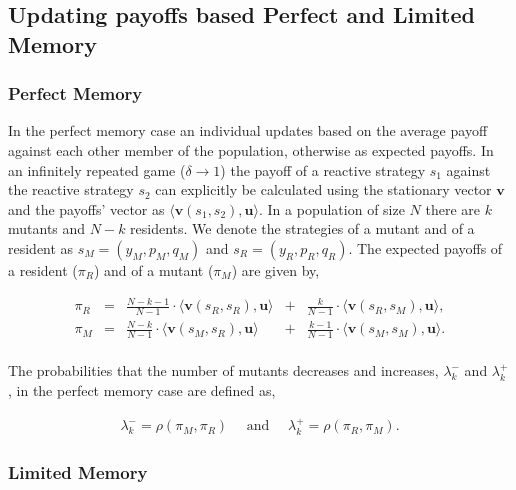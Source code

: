 \documentclass[11pt]{article}
\theoremstyle{plainCl1}
\theoremstyle{plainCl2}
\begin{document}
\subsection{Updating payoffs based Perfect and Limited Memory}

\subsubsection*{Perfect Memory}

In the perfect memory case an individual updates based on the average payoff
against each other member of the population, otherwise as expected payoffs. In
an infinitely repeated game ($\delta \rightarrow 1$) the payoff of a reactive
strategy \(s_1\) against the reactive strategy \(s_2\) can explicitly be
calculated using the stationary vector \(\mathbf{v}\) and the payoffs' vector as
\(\langle\mathbf{v}(s_1,s_2),\mathbf{u}\rangle\). In a population of size \(N\)
there are \(k\) mutants and \(N - k\) residents. We denote the strategies of
a mutant and of a resident as \(s_M =(y_M, p_M, q_M)\) and \(s_R =
(y_R, p_R, q_R)\). The expected payoffs of a resident (\(\pi_R\)) and of a
mutant (\(\pi_M\)) are given by,

\begin{equation} \label{Eq:ExpPay}
  \begin{array}{lcrcr}
  \displaystyle \pi_R & = &\displaystyle \frac{N\!-\!k\!-\!1}{N-1}\cdot \langle\mathbf{v}(s_R,s_R),\mathbf{u}\rangle	&+	&\displaystyle\frac{k}{N-1}\cdot \langle\mathbf{v}(s_R,s_M),\mathbf{u}\rangle,\\[0.5cm]
  \displaystyle \pi_M & = &\displaystyle\frac{N-k}{N-1}\cdot \langle\mathbf{v}(s_M,s_R),\mathbf{u}\rangle&+	&\displaystyle\frac{k-1}{N-1}\cdot \langle\mathbf{v}(s_M,s_M),\mathbf{u}\rangle.\\
  \end{array}
\end{equation}

The probabilities that the number of mutants decreases and increases,
\(\lambda^-_k\) and \(\lambda^+_k\), in the perfect memory case are defined as,

\begin{align}\label{eq:perfect_memory_lambdas}
  \lambda^-_k \!=\!\rho(\pi_M, \pi_R) \quad \text{ and } \quad \lambda^+_k \!=\!\rho(\pi_R, \pi_M).
\end{align}

\subsubsection*{Limited Memory}
\end{document}
